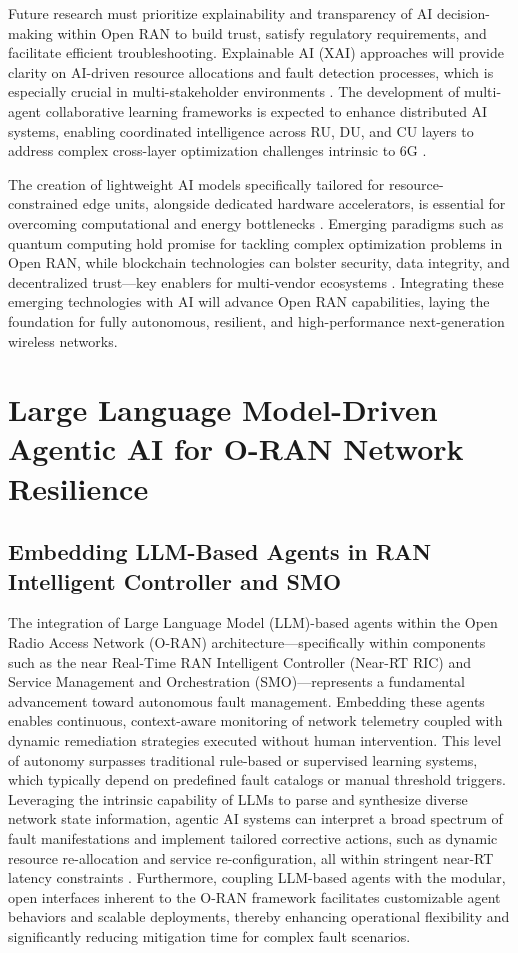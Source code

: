 Future research must prioritize explainability and transparency of AI decision-making within Open RAN to build trust, satisfy regulatory requirements, and facilitate efficient troubleshooting. Explainable AI (XAI) approaches will provide clarity on AI-driven resource allocations and fault detection processes, which is especially crucial in multi-stakeholder environments \cite{ref54}. The development of multi-agent collaborative learning frameworks is expected to enhance distributed AI systems, enabling coordinated intelligence across RU, DU, and CU layers to address complex cross-layer optimization challenges intrinsic to 6G \cite{ref48}.

The creation of lightweight AI models specifically tailored for resource-constrained edge units, alongside dedicated hardware accelerators, is essential for overcoming computational and energy bottlenecks \cite{ref50}. Emerging paradigms such as quantum computing hold promise for tackling complex optimization problems in Open RAN, while blockchain technologies can bolster security, data integrity, and decentralized trust—key enablers for multi-vendor ecosystems \cite{ref54}. Integrating these emerging technologies with AI will advance Open RAN capabilities, laying the foundation for fully autonomous, resilient, and high-performance next-generation wireless networks.

\section{Large Language Model-Driven Agentic AI for O-RAN Network Resilience}

\subsection{Embedding LLM-Based Agents in RAN Intelligent Controller and SMO}

The integration of Large Language Model (LLM)-based agents within the Open Radio Access Network (O-RAN) architecture—specifically within components such as the near Real-Time RAN Intelligent Controller (Near-RT RIC) and Service Management and Orchestration (SMO)—represents a fundamental advancement toward autonomous fault management. Embedding these agents enables continuous, context-aware monitoring of network telemetry coupled with dynamic remediation strategies executed without human intervention. This level of autonomy surpasses traditional rule-based or supervised learning systems, which typically depend on predefined fault catalogs or manual threshold triggers. Leveraging the intrinsic capability of LLMs to parse and synthesize diverse network state information, agentic AI systems can interpret a broad spectrum of fault manifestations and implement tailored corrective actions, such as dynamic resource re-allocation and service re-configuration, all within stringent near-RT latency constraints \cite{ref55}. Furthermore, coupling LLM-based agents with the modular, open interfaces inherent to the O-RAN framework facilitates customizable agent behaviors and scalable deployments, thereby enhancing operational flexibility and significantly reducing mitigation time for complex fault scenarios.

